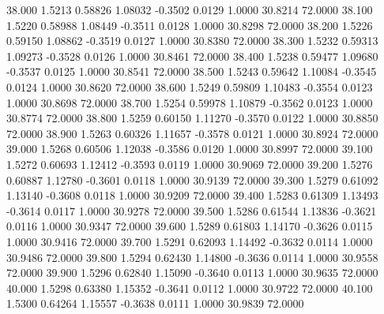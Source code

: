   38.000   1.5213   0.58826   1.08032  -0.3502   0.0129   1.0000  30.8214  72.0000
  38.100   1.5220   0.58988   1.08449  -0.3511   0.0128   1.0000  30.8298  72.0000
  38.200   1.5226   0.59150   1.08862  -0.3519   0.0127   1.0000  30.8380  72.0000
  38.300   1.5232   0.59313   1.09273  -0.3528   0.0126   1.0000  30.8461  72.0000
  38.400   1.5238   0.59477   1.09680  -0.3537   0.0125   1.0000  30.8541  72.0000
  38.500   1.5243   0.59642   1.10084  -0.3545   0.0124   1.0000  30.8620  72.0000
  38.600   1.5249   0.59809   1.10483  -0.3554   0.0123   1.0000  30.8698  72.0000
  38.700   1.5254   0.59978   1.10879  -0.3562   0.0123   1.0000  30.8774  72.0000
  38.800   1.5259   0.60150   1.11270  -0.3570   0.0122   1.0000  30.8850  72.0000
  38.900   1.5263   0.60326   1.11657  -0.3578   0.0121   1.0000  30.8924  72.0000
  39.000   1.5268   0.60506   1.12038  -0.3586   0.0120   1.0000  30.8997  72.0000
  39.100   1.5272   0.60693   1.12412  -0.3593   0.0119   1.0000  30.9069  72.0000
  39.200   1.5276   0.60887   1.12780  -0.3601   0.0118   1.0000  30.9139  72.0000
  39.300   1.5279   0.61092   1.13140  -0.3608   0.0118   1.0000  30.9209  72.0000
  39.400   1.5283   0.61309   1.13493  -0.3614   0.0117   1.0000  30.9278  72.0000
  39.500   1.5286   0.61544   1.13836  -0.3621   0.0116   1.0000  30.9347  72.0000
  39.600   1.5289   0.61803   1.14170  -0.3626   0.0115   1.0000  30.9416  72.0000
  39.700   1.5291   0.62093   1.14492  -0.3632   0.0114   1.0000  30.9486  72.0000
  39.800   1.5294   0.62430   1.14800  -0.3636   0.0114   1.0000  30.9558  72.0000
  39.900   1.5296   0.62840   1.15090  -0.3640   0.0113   1.0000  30.9635  72.0000
  40.000   1.5298   0.63380   1.15352  -0.3641   0.0112   1.0000  30.9722  72.0000
  40.100   1.5300   0.64264   1.15557  -0.3638   0.0111   1.0000  30.9839  72.0000
